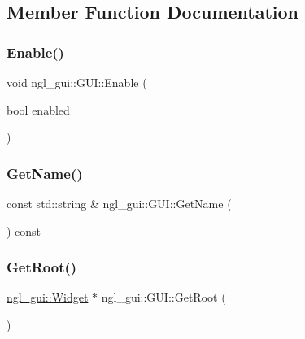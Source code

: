 \subsection{Member Function Documentation}
\mbox{\label{classngl__gui_1_1_g_u_i_aa7dd88efa3541dd071aa80d7563bfc18}} 
\subsubsection{\texorpdfstring{Enable()}{Enable()}}
{\footnotesize\ttfamily void ngl\+\_\+gui\+::\+G\+U\+I\+::\+Enable (\begin{DoxyParamCaption}\item[{bool}]{enabled }\end{DoxyParamCaption})}

\mbox{\label{classngl__gui_1_1_g_u_i_a5351aafd68b7b5feca4f723735b258d1}} 
\subsubsection{\texorpdfstring{Get\+Name()}{GetName()}}
{\footnotesize\ttfamily const std\+::string \& ngl\+\_\+gui\+::\+G\+U\+I\+::\+Get\+Name (\begin{DoxyParamCaption}{ }\end{DoxyParamCaption}) const}

\mbox{\label{classngl__gui_1_1_g_u_i_a52a2520dc946a7512ad4e57bafc6663f}} 
\subsubsection{\texorpdfstring{Get\+Root()}{GetRoot()}}
{\footnotesize\ttfamily \mbox{\hyperlink{classngl__gui_1_1_widget}{ngl\+\_\+gui\+::\+Widget}} $\ast$ ngl\+\_\+gui\+::\+G\+U\+I\+::\+Get\+Root (\begin{DoxyParamCaption}{ }\end{DoxyParamCaption})}

